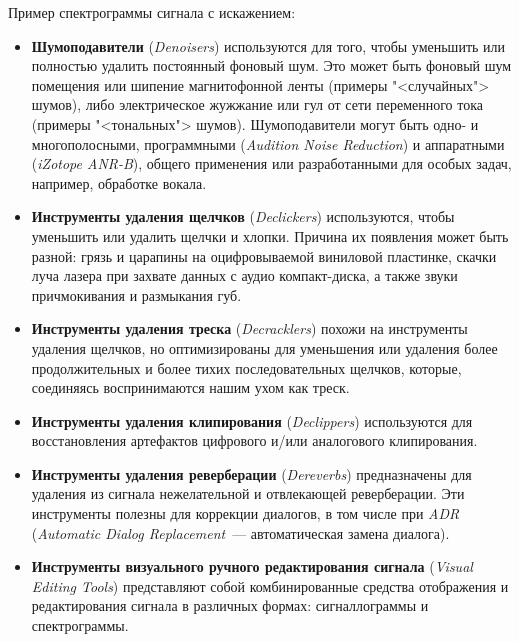 \documentclass{beamer}
\begin{document}
\begin{frame}
  Пример спектрограммы сигнала с искажением:
\end{frame}


\begin{frame}
  \begin{itemize}
    \item \textbf{Шумоподавители} (\textit{Denoisers}) используются для того, чтобы уменьшить или полностью удалить постоянный фоновый шум. Это может быть фоновый шум помещения или шипение магнитофонной ленты (примеры "<случайных"> шумов), либо электрическое жужжание или гул от сети переменного тока (примеры "<тональных"> шумов). Шумоподавители могут быть одно- и многополосными, программными (\textit{Audition Noise Reduction}) и аппаратными (\textit{iZotope ANR-B}), общего применения или разработанными для особых задач, например, обработке вокала.
    \item \textbf{Инструменты удаления щелчков} (\textit{Declickers}) используются, чтобы уменьшить или удалить щелчки и хлопки. Причина их появления может быть разной: грязь и царапины на оцифровываемой виниловой пластинке,  скачки луча лазера при захвате данных с аудио компакт-диска, а также звуки причмокивания и размыкания губ.
  \end{itemize}
\end{frame}

\begin{frame}
  \begin{itemize}
    \item \textbf{Инструменты удаления треска} (\textit{Decracklers}) похожи на инструменты удаления щелчков, но оптимизированы для уменьшения или удаления более продолжительных и более тихих последовательных щелчков, которые, соединяясь воспринимаются нашим ухом как треск.
    \item \textbf{Инструменты удаления клипирования} (\textit{Declippers}) используются для восстановления артефактов цифрового и/или аналогового клипирования.
    \item \textbf{Инструменты удаления реверберации} (\emph{Dereverbs}) предназначены для удаления из сигнала нежелательной и отвлекающей реверберации. Эти инструменты полезны для коррекции диалогов, в том числе при \emph{ADR} (\emph{Automatic Dialog Replacement}~--- автоматическая замена диалога).
    \item \textbf{Инструменты визуального ручного редактирования сигнала} (\emph{Visual Editing Tools}) представляют собой комбинированные средства отображения и редактирования сигнала в различных формах: сигналлограммы и спектрограммы.
  \end{itemize}
\end{frame}
\end{document}
